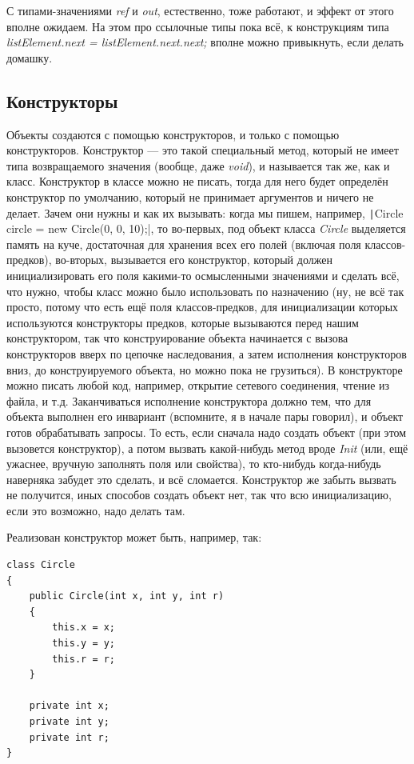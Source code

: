 \documentclass[a5paper]{article}
\begin{document}
С типами-значениями \textit{ref} и \textit{out}, естественно, тоже работают, и эффект от этого вполне ожидаем. На этом про ссылочные типы пока всё, к конструкциям типа \textit{listElement.next = listElement.next.next;} вполне можно привыкнуть, если делать домашку.

\subsection{Конструкторы}

Объекты создаются с помощью конструкторов, и только с помощью конструкторов. Конструктор --- это такой специальный метод, который не имеет типа возвращаемого значения (вообще, даже \textit{void}), и называется так же, как и класс. Конструктор в классе можно не писать, тогда для него будет определён конструктор по умолчанию, который не принимает аргументов и ничего не делает. Зачем они нужны и как их вызывать: когда мы пишем, например, \texttt|Circle circle = new Circle(0, 0, 10);|, то во-первых, под объект класса \textit{Circle} выделяется память на куче, достаточная для хранения всех его полей (включая поля классов-предков), во-вторых, вызывается его конструктор, который должен инициализировать его поля какими-то осмысленными значениями и сделать всё, что нужно, чтобы класс можно было использовать по назначению (ну, не всё так просто, потому что есть ещё поля классов-предков, для инициализации которых используются конструкторы предков, которые вызываются перед нашим конструктором, так что конструирование объекта начинается с вызова конструкторов вверх по цепочке наследования, а затем исполнения конструкторов вниз, до конструируемого объекта, но можно пока не грузиться). В конструкторе можно писать любой код, например, открытие сетевого соединения, чтение из файла, и т.д. Заканчиваться исполнение конструктора должно тем, что для объекта выполнен его инвариант (вспомните, я в начале пары говорил), и объект готов обрабатывать запросы. То есть, если сначала надо создать объект (при этом вызовется конструктор), а потом вызвать какой-нибудь метод вроде \textit{Init} (или, ещё ужаснее, вручную заполнять поля или свойства), то кто-нибудь когда-нибудь наверняка забудет это сделать, и всё сломается. Конструктор же забыть вызвать не получится, иных способов создать объект нет, так что всю инициализацию, если это возможно, надо делать там.

Реализован конструктор может быть, например, так:

\begin{verbatim}
class Circle
{
    public Circle(int x, int y, int r)
    {
        this.x = x;
        this.y = y;
        this.r = r;
    }

    private int x;
    private int y;
    private int r;
}
\end{verbatim}
\end{document}

